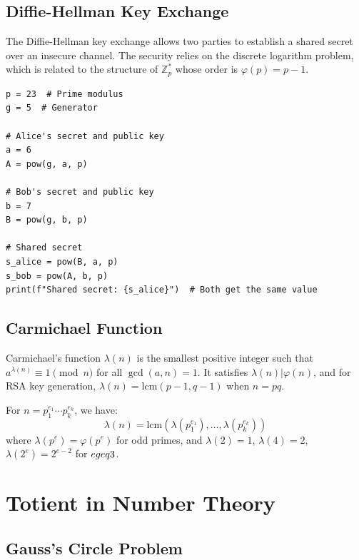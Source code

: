 \subsection{Diffie-Hellman Key Exchange}

The Diffie-Hellman key exchange allows two parties to establish a shared secret over an insecure channel. The security relies on the discrete logarithm problem, which is related to the structure of $\mathbb{Z}_p^*$ whose order is $\varphi(p) = p-1$.

\begin{lstlisting}[caption={Diffie-Hellman key exchange}, label=lst:dh]
p = 23  # Prime modulus
g = 5  # Generator

# Alice's secret and public key
a = 6
A = pow(g, a, p)

# Bob's secret and public key
b = 7
B = pow(g, b, p)

# Shared secret
s_alice = pow(B, a, p)
s_bob = pow(A, b, p)
print(f"Shared secret: {s_alice}")  # Both get the same value
\end{lstlisting}

\subsection{Carmichael Function}

Carmichael's function $\lambda(n)$ is the smallest positive integer such that $a^{\lambda(n)} \equiv 1 \pmod{n}$ for all $\gcd(a,n) = 1$. It satisfies $\lambda(n) | \varphi(n)$, and for RSA key generation, $\lambda(n) = \text{lcm}(p-1, q-1)$ when $n = pq$.

\begin{theorem}
For $n = p_1^{e_1} \cdots p_k^{e_k}$, we have:
\[
\lambda(n) = \text{lcm}(\lambda(p_1^{e_1}), \ldots, \lambda(p_k^{e_k}))
\]
where $\lambda(p^e) = \varphi(p^e)$ for odd primes, and $\lambda(2) = 1$, $\lambda(4) = 2$, $\lambda(2^e) = 2^{e-2}$ for $e \\geq 3$.
\end{theorem}

\section{Totient in Number Theory}

\subsection{Gauss's Circle Problem}

